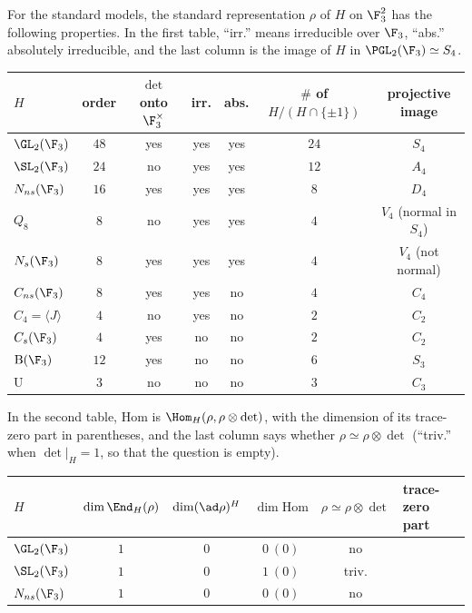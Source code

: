 \begin{proposition}\label{prop:reps:gl23-table}
For the standard models, the standard representation $\rho$ of $H$ on $\F_3^2$ has the following properties. In the first table,
``irr.'' means irreducible over $\F_3$, ``abs.'' absolutely irreducible, and the last column is the image of $H$ in $\PGL_2(\F_3)\simeq S_4$.
\begin{center}
\begin{tabular}{lcccccc}
\toprule
$H$ & order & $\det$ onto $\F_3^\times$ & irr. & abs. & $\#$ of $H/(H\cap\{\pm1\})$ & projective image\\
\midrule
$\GL_2(\F_3)$ & $48$ & yes & yes & yes & $24$ & $S_4$\\
$\SL_2(\F_3)$ & $24$ & no & yes & yes & $12$ & $A_4$\\
$N_{ns}(\F_3)$ & $16$ & yes & yes & yes & $8$ & $D_4$\\
$Q_8$ & $8$ & no & yes & yes & $4$ & $V_4$ (normal in $S_4$)\\
$N_s(\F_3)$ & $8$ & yes & yes & yes & $4$ & $V_4$ (not normal)\\
$C_{ns}(\F_3)$ & $8$ & yes & yes & no & $4$ & $C_4$\\
$C_4=\langle J\rangle$ & $4$ & no & yes & no & $2$ & $C_2$\\
$C_s(\F_3)$ & $4$ & yes & no & no & $2$ & $C_2$\\
$\mathrm B(\F_3)$ & $12$ & yes & no & no & $6$ & $S_3$\\
$\mathrm U$ & $3$ & no & no & no & $3$ & $C_3$\\
\bottomrule
\end{tabular}
\end{center}
In the second table, $\mathrm{Hom}$ is $\Hom_H(\rho,\rho\otimes\det)$, with the dimension of its trace-zero part in parentheses, and the last
column says whether $\rho\simeq\rho\otimes\det$ (``triv.'' when $\det|_H=1$, so that the question is empty).
\begin{center}
\begin{tabular}{lccccl}
\toprule
$H$ & $\dim\End_H(\rho)$ & $\dim(\ad\rho)^H$ & $\dim\mathrm{Hom}$ & $\rho\simeq\rho\otimes\det$ & trace-zero part\\
\midrule
$\GL_2(\F_3)$ & $1$ & $0$ & $0\ (0)$ & no & \\
$\SL_2(\F_3)$ & $1$ & $0$ & $1\ (0)$ & triv. & \\
$N_{ns}(\F_3)$ & $1$ & $0$ & $0\ (0)$ & no & \\

\end{tabular}
\end{center}
\end{proposition}
